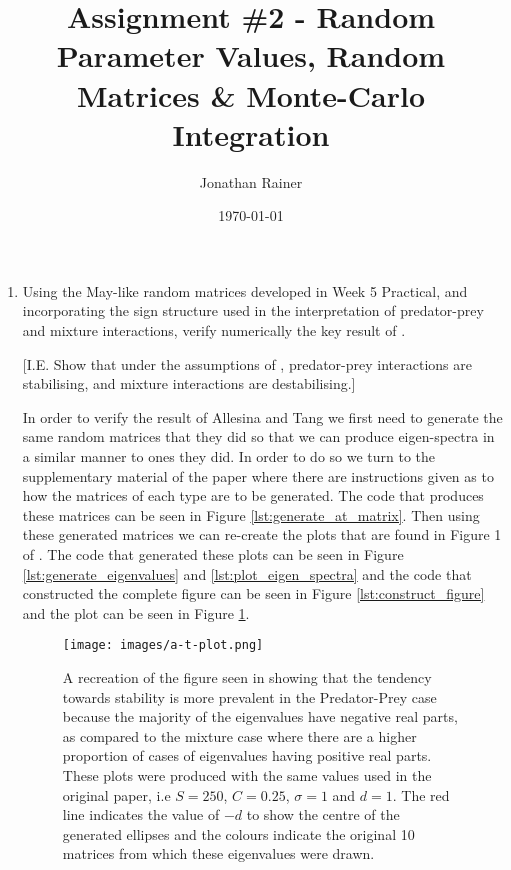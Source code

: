 \documentclass[11pt]{scrreprt}
\title{Assignment \#2 - Random Parameter Values, Random Matrices \& Monte-Carlo Integration}
\date{\today}
\author{Jonathan Rainer}
\begin{document}
	\fancyhf{}
	\chead{\thepage}
	\rhead{\today}
	\renewcommand{\headrulewidth}{0.3pt}
	\renewcommand{\footrulewidth}{0.3pt}
	\renewcommand{\footrulewidth}{0pt}
	\maketitle
	
	\setcounter{chapter}{1}
	\begin{enumerate}
	
		\item Using the May-like random matrices developed in Week 5 Practical, and incorporating the sign structure used in the \citet{Allesina2012} interpretation of predator-prey and mixture interactions, verify numerically the key result of \cite{Allesina2012}.
		
		[I.E. Show that under the assumptions of \cite{Allesina2012}, predator-prey interactions are stabilising, and mixture interactions are destabilising.]
		
		In order to verify the result of Allesina and Tang we first need to generate the same random matrices that they did so that we can produce eigen-spectra in a similar manner to ones they did. In order to do so we turn to the supplementary material \cite{Allesina2012} of the paper where there are instructions given as to how the matrices of each type are to be generated. The code that produces these matrices can be seen in Figure \ref{lst:generate_at_matrix}. Then using these generated matrices we can re-create the plots that are found in Figure 1 of \cite{Allesina2012}. The code that generated these plots can be seen in Figure \ref{lst:generate_eigenvalues} and \ref{lst:plot_eigen_spectra} and the code that constructed the complete figure can be seen in Figure \ref{lst:construct_figure} and the plot can be seen in Figure \ref{fig:a-t_related_plot}.
		
		\begin{figure}[ht]
			\begin{center}
				\texttt{[image: images/a-t-plot.png]}
			\end{center}
			\caption{A recreation of the figure seen in \citet{Allesina2012} showing that the tendency towards stability is more prevalent in the Predator-Prey case because the majority of the eigenvalues have negative real parts, as compared to the mixture case where there are a higher proportion of cases of eigenvalues having positive real parts. These plots were produced with the same values used in the original paper, i.e $S=250$, $C = 0.25$, $\sigma = 1$ and $d = 1$. The red line indicates the value of $-d$ to show the centre of the generated ellipses and the colours indicate the original 10 matrices from which these eigenvalues were drawn.}
			\label{fig:a-t_related_plot}
		\end{figure}
		

\end{enumerate}
\end{document}
